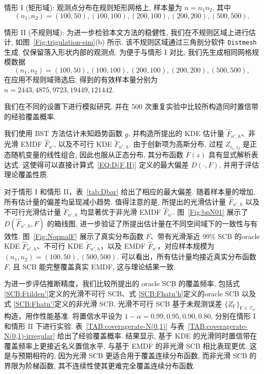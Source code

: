 \documentclass[a4paper,openay,14pt]{ctexbook}
\numberwithin{equation}{section}
\numberwithin{lem}{section}
\begin{document}
情形 I (矩形域): 观测点分布在规则矩形网格上, 样本量为 \( n = n_1 n_2 \), 其中  
\[
(n_1, n_2) = (100, 50), (100, 100), (200, 100), (200, 200), (500, 500).
\]

情形 II (不规则域): 为进一步检验本文方法的稳健性, 我们在不规则区域上进行估计, 如图~\ref{Fig:trigulation-sim}(b) 所示. 该不规则区域通过三角剖分软件 \texttt{Distmesh} 生成, 仅保留落入形状内部的观测点. 为便于与情形 I 对比, 我们先生成相同网格规模数据  
\[
(n_1, n_2) = (100, 50), (100, 100), (200, 100), (200, 200), (500, 500),
\]
在应用不规则域筛选后, 得到的有效样本量分别为  
\(n = 2443, 4875, 9723, 19449, 121442.\)

我们在不同的设置下进行模拟研究, 并在 500 次重复实验中比较所构造同时置信带的经验覆盖概率.

我们使用 BST 方法估计未知趋势函数 \( g \), 并构造所提出的 KDE 估计量 \( \hat{F}_{n',h} \)、非光滑 EMDF \( \hat{F}_{n'} \), 以及不可行 KDE \( \tilde{F}_{n',h} \). 由于创新项为高斯分布, 过程 \( Z_{i_1,i_2} \) 是正态随机变量的线性组合, 因此也服从正态分布, 其分布函数 \( F(z) \) 具有显式解析表达式. 这使得可以直接计算式~\eqref{EQ:D(F,H)} 定义的最大偏差 \( D(\cdot, F) \), 并用于评估理论覆盖性质.

对于情形 I 和情形 II，表~\ref{tab:Dbar} 给出了相应的最大偏差. 随着样本量的增加, 所有估计量的偏差均呈现减小趋势. 值得注意的是, 所提出的光滑估计量 \( \hat{F}_{n',h} \) 以及不可行光滑估计量 \( \tilde{F}_{n',h} \) 均显著优于非光滑 EMDF \( \hat{F}_{n'} \). 图~\ref{Fig:bpN01} 展示了 \( D(\hat{F}_{n',h}, F) \) 的箱线图, 进一步验证了所提出估计量在不同空间域下的一致性与有效性. 图~\ref{Fig:NormalF} 展示了真实分布函数 \( F \)、带有光滑渐近 99\% SCB 的oracle KDE \( \hat{F}_{n',h} \)、不可行 KDE \( \tilde{F}_{n',h} \)，以及 EMDF $\hat{F}_{n'}$，对应样本规模为 \((n_1, n_2) = (100, 50), (500, 500).\) 可以看出，所有估计量均接近真实分布函数 \( F \), 且 SCB 能完整覆盖真实 EMDF, 这与理论结果一致.

为进一步评估推断精度，我们比较所提出的 oracle SCB 的覆盖频率, 包括式 \eqref{SCB:Ftilden'}定义的光滑不可行 SCB、式 \eqref{SCB:Fhatn'h}定义的oracle SCB 以及式 \eqref{SCB:Fhatn'}定义的非光滑 SCB. 光滑不可行 SCB 基于未观测误差 \(\{Z_{\mathbf{i}'}\}_{\mathbf{i}'\in\mathcal{I}_{n'}}\) 构造，用作性能基准. 将置信水平设为 \(1-\alpha = 0.99, 0.95, 0.90, 0.80\), 分别在情形 I 和情形 II 下进行实验. 表~\ref{TAB:coveragerate-N(0,1)} 与表~\ref{TAB:coveragerate-N(0,1)-irregular} 给出了经验覆盖概率. 结果显示, 基于 KDE 的光滑同时置信带在覆盖频率上更接近名义置信水平, 与基于 EMDF 的非光滑 SCB 相比表现更优. 这是与预期相符的, 因为光滑 SCB 更适合用于覆盖连续分布函数, 而非光滑 SCB 的界限为阶梯函数, 其不连续性使其更难完全覆盖连续分布函数.
\end{document}
